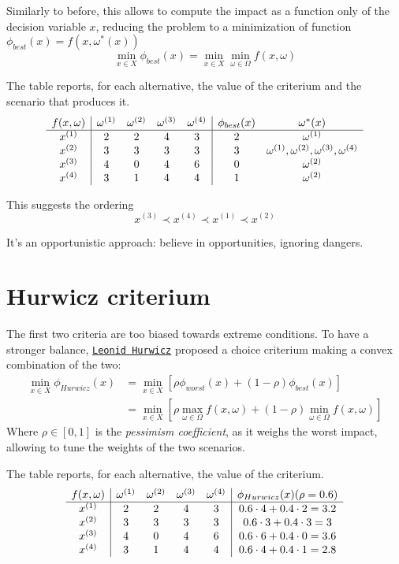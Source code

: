 Similarly to before, this allows to compute the impact as a function only of the decision variable $x$, reducing the problem to a minimization of function $\phi_{best} (x) = f (x, \omega^\ast (x))$
$$ \min_{x \in X} \phi_{best} (x) = \min_{x \in X} \min_{\omega \in \Omega} f(x, \omega) $$

The table reports, for each alternative, the value of the criterium and the scenario that produces it.
$$
\begin{array}{c|cccc | c c}
	f(x,\omega) & \omega^{(1)} & \omega^{(2)} & \omega^{(3)} & \omega^{(4)}  & \phi_{best} (x) & \omega^\ast (x) \\
	\hline
	x^{(1)} & 2 & 2 & 4 & 3 & 2 & \omega^{(1)} \\
	x^{(2)} & 3 & 3 & 3 & 3 & 3  & \omega^{(1)}, \omega^{(2)}, \omega^{(3)}, \omega^{(4)} \\
	x^{(3)} & 4 & 0 & 4 & 6 & 0 & \omega^{(2)} \\
	x^{(4)} & 3 & 1 & 4 & 4 & 1 & \omega^{(2)} \\
\end{array}
$$

This suggests the ordering
$$ x^{(3)} \prec x^{(4)} \prec x^{(1)} \prec x^{(2)} $$

It's an opportunistic approach: believe in opportunities, ignoring dangers.

\section{Hurwicz criterium}
\label{sec:hurwicz}

The first two criteria are too biased towards extreme conditions. To have a stronger balance, \href{https://en.wikipedia.org/wiki/Leonid_Hurwicz}{\texttt{Leonid Hurwicz}} proposed a choice criterium making a convex combination of the two:
\begin{align*}
	\min_{x \in X} \phi_{Hurwicz} (x) & = \min_{x \in X} \left[\rho \phi_{worst}(x) + (1- \rho) \phi_{best} (x) \right] \\
	& = \min_{x \in X} \left[\rho \max_{\omega \in \Omega} f (x, \omega) + (1-\rho) \min_{\omega \in \Omega} f(x, \omega)\right]
\end{align*}
Where $\rho \in [0,1]$ is the \textit{pessimism coefficient}, as it weighs the worst impact, allowing to tune the weights of the two scenarios.

The table reports, for each alternative, the value of the criterium.
$$
\begin{array}{c|cccc | c}
	f(x,\omega) & \omega^{(1)} & \omega^{(2)} & \omega^{(3)} & \omega^{(4)}  & \phi_{Hurwicz} (x) (\rho = 0.6) \\
	\hline
	x^{(1)} & 2 & 2 & 4 & 3 & 0.6 \cdot 4 + 0.4 \cdot 2 = 3.2 \\
	x^{(2)} & 3 & 3 & 3 & 3 & 0.6 \cdot 3 + 0.4 \cdot 3 = 3 \\
	x^{(3)} & 4 & 0 & 4 & 6 & 0.6 \cdot 6 + 0.4 \cdot 0 = 3.6 \\
	x^{(4)} & 3 & 1 & 4 & 4 & 0.6 \cdot 4 + 0.4 \cdot 1 = 2.8 \\
\end{array}
$$

